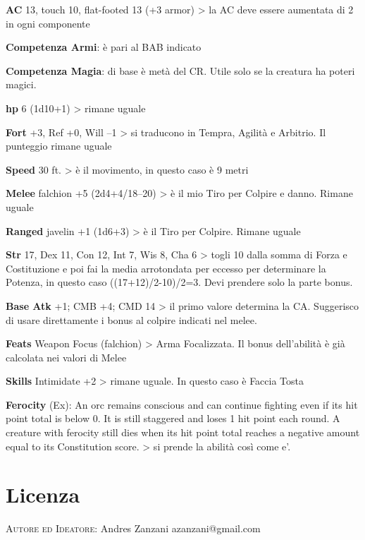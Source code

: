 \documentclass[a4paper,11pt,twoside,openany]{book}
\begin{document}
\textbf{AC} 13, touch 10, flat-footed 13 (+3 armor) \textgreater{} la AC deve essere aumentata di 2 in ogni componente

\textbf{Competenza Armi}: è pari al BAB indicato

\textbf{Competenza Magia}: di base è metà del CR. Utile solo se la creatura ha poteri magici.

\textbf{hp} 6 (1d10+1) \textgreater{} rimane uguale

\textbf{Fort} +3, Ref +0, Will --1 \textgreater{} si traducono in Tempra, Agilità e Arbitrio. Il punteggio rimane uguale

\textbf{Speed} 30 ft. \textgreater{} è il movimento, in questo
caso è 9 metri

\textbf{Melee} falchion +5 (2d4+4/18--20) \textgreater{} è il mio Tiro per Colpire e danno. Rimane uguale

\textbf{Ranged} javelin +1 (1d6+3) \textgreater{} è il Tiro per Colpire. Rimane uguale

\textbf{Str} 17, Dex 11, Con 12, Int 7, Wis 8, Cha 6 \textgreater{} togli 10 dalla somma di Forza e Costituzione e poi fai la media arrotondata per eccesso per determinare la Potenza, in questo caso ((17+12)/2-10)/2=3. Devi prendere solo la parte bonus.

\textbf{Base Atk} +1; CMB +4; CMD 14 \textgreater{} il primo valore determina la CA. Suggerisco di usare direttamente i bonus al colpire indicati nel melee.

\textbf{Feats} Weapon Focus (falchion) \textgreater{} Arma Focalizzata. Il bonus dell'abilità è già calcolata nei valori di Melee

\textbf{Skills} Intimidate +2 \textgreater{} rimane uguale. In questo caso è Faccia Tosta

\textbf{Ferocity} (Ex): An orc remains conscious and can continue fighting even if its hit point total is below 0. It is still staggered and loses 1 hit point each round. A creature with ferocity still dies when its hit point total reaches a negative amount equal to its Constitution score. \textgreater{} si prende la abilità così come e'.

\pagebreak

\section{Licenza}

\bigskip

\textsc{Autore ed Ideatore}: Andres Zanzani azanzani@gmail.com
\end{document}
